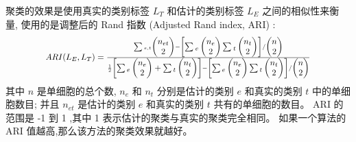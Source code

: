 聚类的效果是使用真实的类别标签 $L_T$ 和估计的类别标签 $L_E$ 之间的相似性来衡量,
使用的是调整后的 Rand 指数 (Adjusted Rand index, ARI) \cite{hubert1985comparing,wu2005dynamic}:
\begin{equation}
\label{eq:ARI}
\resizebox{0.8\textwidth}{!}{$
    ARI(L_E,L_T)=\frac{\sum_{}{}_{e,t} \begin{pmatrix}n_{et}\\ 2\end{pmatrix} - \begin{bmatrix}  \sum_{}{}_{e} \begin{pmatrix}n_{e}\\ 2\end{pmatrix}\sum_{}{}_{t} \begin{pmatrix}n_{t}\\ 2\end{pmatrix}  \end{bmatrix} / \begin{pmatrix}n\\ 2\end{pmatrix} 
    }{\frac{1}{2}\begin{bmatrix}
    \sum{}{}_e\begin{pmatrix}n_{e}\\ 2\end{pmatrix} + \sum{}{}_t\begin{pmatrix}n_{t}\\ 2\end{pmatrix}
    \end{bmatrix} - \begin{bmatrix}
    \sum{}{}_e\begin{pmatrix}n_{e}\\ 2\end{pmatrix} \sum{}{}_t\begin{pmatrix}n_{t}\\ 2\end{pmatrix} 
    \end{bmatrix}/\begin{pmatrix}n\\ 2\end{pmatrix}}    
$}
\end{equation}
其中 $n$ 是单细胞的总个数, 
$n_e$ 和 $n_t$ 分别是估计的类别 $e$ 和真实的类别 $t$ 中的单细胞数目; 
并且 $n_{et}$ 是估计的类别 $e$ 和真实的类别 $t$ 共有的单细胞的数目。
ARI 的范围是 -1 到 1 ,其中 1 表示估计的聚类与真实的聚类完全相同。
如果一个算法的 ARI 值越高,那么该方法的聚类效果就越好。

